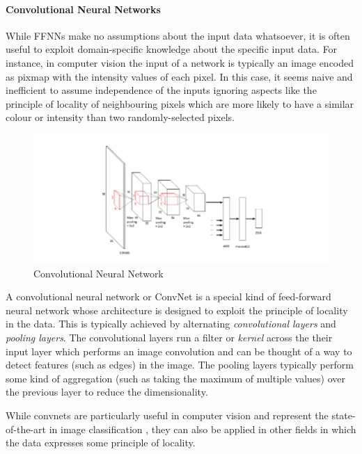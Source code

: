 \paragraph{Convolutional Neural Networks} While FFNNs make no assumptions about the input data whatsoever, it is often useful to exploit domain-specific knowledge about the specific input data. For instance, in computer vision the input of a network is typically an image encoded as pixmap with the intensity values of each pixel. In this case, it seems naive and inefficient to assume independence of the inputs ignoring aspects like the principle of locality of neighbouring pixels which are more likely to have a similar colour or intensity than two randomly-selected pixels. 
\begin{figure}[h]
	\centering
	\includegraphics[width=1\textwidth]{figures/chapter-2/convnet.png}
	\caption{Convolutional Neural Network}\label{fig:convnet}   
\end{figure}
A convolutional neural network or ConvNet is a special kind of feed-forward neural network whose architecture is designed to exploit the principle of locality in the data. This is typically achieved by alternating \emph{convolutional layers} and \emph{pooling layers}. The convolutional layers run a filter or \emph{kernel} across the their input layer which performs an image convolution and can be thought of a way to detect features (such as edges) in the image. The pooling layers typically perform some kind of aggregation (such as taking the maximum of multiple values) over the previous layer to reduce the dimensionality. 

While convnets are particularly useful in computer vision and represent the state-of-the-art in image classification %
, they can also be applied in other fields in which the data expresses some principle of locality. 

